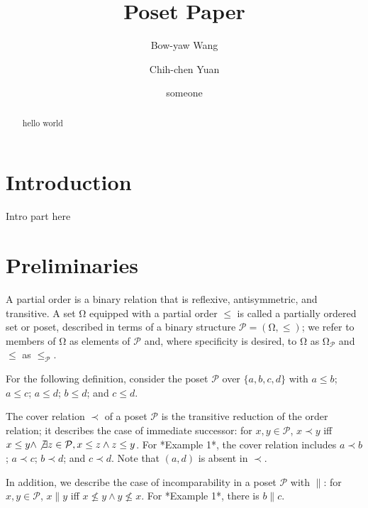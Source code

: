 \documentclass{llncs}
\begin{document}
\title{Poset Paper}
\author{Bow-yaw Wang \and Chih-chen Yuan \and someone}
\maketitle

\begin{abstract}
hello world
\end{abstract}

\section{Introduction}
Intro part here

\section{Preliminaries}

A partial order is a binary relation that is reflexive, antisymmetric, and transitive. A set $\mathrm{\Omega}$ equipped with a partial order $\leq$ is called a partially ordered set or poset, described in terms of a binary structure $\mathcal{P} = (\mathrm{\Omega}, \leq)$; we refer to members of $\mathrm{\Omega}$ as elements of $\mathcal{P}$ and, where specificity is desired, to $\mathrm{\Omega}$ as $\mathrm{\Omega}_{\mathcal{P}}$ and $\leq$ as $\leq_{\mathcal{P}}$.

\begin{example}
    For the following definition, consider the poset $\mathcal{P}$ over $\{a,b,c,d\}$ with $a \leq b$; $a \leq c$; $a \leq d$; $b \leq d$; and $c \leq d$.
\end{example}

The cover relation $\prec$ of a poset $\mathcal{P}$ is the transitive reduction of the order relation; it describes the case of immediate successor: for $x, y \in \mathcal{P}$, $x \prec y$ iff $x \leq y \wedge \not\exists z \in \mathcal{P}, x \leq z \wedge z \leq y$. For *Example 1*, the cover relation includes $a \prec b$; $a \prec c$; $b \prec d$; and $c \prec d$. Note that $(a, d)$ is absent in $\prec$.

In addition, we describe the case of incomparability in a poset $\mathcal{P}$ with $\parallel$: for $x, y \in \mathcal{P}$, $x \parallel y$ iff $x \not\leq y \wedge y \not\leq x$. For *Example 1*, there is $b \parallel c$.
\end{document}
